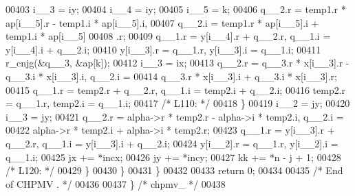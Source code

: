 \begin{DoxyCode}
00403             i\_\_3 = iy;
00404             i\_\_4 = iy;
00405             i\_\_5 = k;
00406             q\_\_2.r = temp1.r * ap[i\_\_5].r - temp1.i * ap[i\_\_5].i, 
00407                 q\_\_2.i = temp1.r * ap[i\_\_5].i + temp1.i * ap[i\_\_5]
00408                 .r;
00409             q\_\_1.r = y[i\_\_4].r + q\_\_2.r, q\_\_1.i = y[i\_\_4].i + q\_\_2.i;
00410             y[i\_\_3].r = q\_\_1.r, y[i\_\_3].i = q\_\_1.i;
00411             r\_cnjg(&q\_\_3, &ap[k]);
00412             i\_\_3 = ix;
00413             q\_\_2.r = q\_\_3.r * x[i\_\_3].r - q\_\_3.i * x[i\_\_3].i, q\_\_2.i =
00414                  q\_\_3.r * x[i\_\_3].i + q\_\_3.i * x[i\_\_3].r;
00415             q\_\_1.r = temp2.r + q\_\_2.r, q\_\_1.i = temp2.i + q\_\_2.i;
00416             temp2.r = q\_\_1.r, temp2.i = q\_\_1.i;
00417 \textcolor{comment}{/* L110: */}
00418         \}
00419         i\_\_2 = jy;
00420         i\_\_3 = jy;
00421         q\_\_2.r = alpha->r * temp2.r - alpha->i * temp2.i, q\_\_2.i = 
00422             alpha->r * temp2.i + alpha->i * temp2.r;
00423         q\_\_1.r = y[i\_\_3].r + q\_\_2.r, q\_\_1.i = y[i\_\_3].i + q\_\_2.i;
00424         y[i\_\_2].r = q\_\_1.r, y[i\_\_2].i = q\_\_1.i;
00425         jx += *incx;
00426         jy += *incy;
00427         kk += *n - j + 1;
00428 \textcolor{comment}{/* L120: */}
00429         \}
00430     \}
00431     \}
00432 
00433     \textcolor{keywordflow}{return} 0;
00434 
00435 \textcolor{comment}{/*     End of CHPMV . */}
00436 
00437 \} \textcolor{comment}{/* chpmv\_ */}
00438 
\end{DoxyCode}
